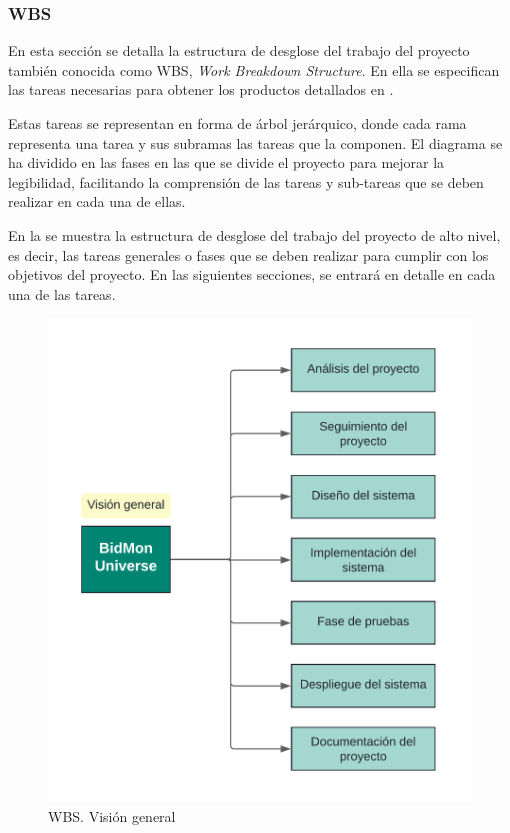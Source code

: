 \subsubsection{WBS}
En esta sección se detalla la estructura de desglose del trabajo del proyecto también conocida como WBS, \textit{Work Breakdown Structure}. 
En ella se especifican las tareas necesarias para obtener los productos detallados en .

Estas tareas se representan en forma de árbol jerárquico, donde cada rama representa una tarea y sus subramas las tareas que la componen.
El diagrama se ha dividido en las fases en las que se divide el proyecto para mejorar la legibilidad, facilitando la comprensión de las tareas y sub-tareas que se deben realizar en cada una de ellas.

En la  se muestra la estructura de desglose del trabajo del proyecto de alto nivel, es decir, 
las tareas generales o fases que se deben realizar para cumplir con los objetivos del proyecto.
En las siguientes secciones, se entrará en detalle en cada una de las tareas.
\begin{figure}[H]
    \hypertarget{fig:5_WBS-Vision-General}{}
    \centering
    \includegraphics[width=0.5\linewidth]{figures/5-WBS/5_WBS-Vision-General.png}
    \caption{WBS. Visión general}
    \label{fig:5_WBS-Vision-General}
\end{figure}

